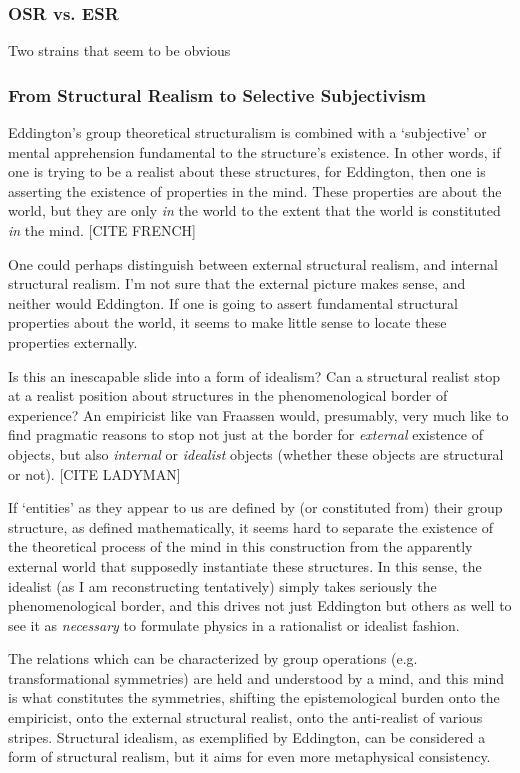\documentclass{article}
\begin{document}
\subsubsection{OSR vs. ESR}

Two strains that seem to be obvious




\subsubsection{From Structural Realism to Selective Subjectivism}

Eddington's group theoretical structuralism is combined with a `subjective' or mental apprehension fundamental to the structure's existence.  In other words, if one is trying to be a realist about these structures, for Eddington, then one is asserting the existence of properties in the mind.  These properties are about the world, but they are only \emph{in} the world to the extent that the world is constituted \emph{in} the mind.  [CITE FRENCH]  

One could perhaps distinguish between external structural realism, and internal structural realism.  I'm not sure that the external picture makes sense, and neither would Eddington.  If one is going to assert fundamental structural properties about the world, it seems to make little sense to locate these properties externally.  

Is this an inescapable slide into a form of idealism?  Can a structural realist stop at a realist position about structures in the phenomenological border of experience?  An empiricist like van Fraassen would, presumably, very much like to find pragmatic reasons to stop not just at the border for \emph{external} existence of objects, but also \emph{internal} or \emph{idealist} objects (whether these objects are structural or not).  [CITE LADYMAN]

If `entities' as they appear to us are defined by (or constituted from) their group structure, as defined mathematically, it seems hard to separate the existence of the theoretical process of the mind in this construction from the apparently external world that supposedly instantiate these structures.  In this sense, the idealist (as I am reconstructing tentatively) simply takes seriously the phenomenological border, and this drives not just Eddington but others as well to see it as \emph{necessary} to formulate physics in a rationalist or idealist fashion.  

The relations which can be characterized by group operations (e.g. transformational symmetries) are held and understood by a mind, and this mind is what constitutes the symmetries, shifting the epistemological burden onto the empiricist, onto the external structural realist, onto the anti-realist of various stripes.  Structural idealism, as exemplified by Eddington, can be considered a form of structural realism, but it aims for even more metaphysical consistency.  
\end{document}
